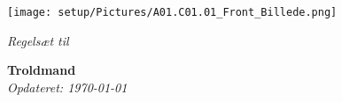 \documentclass[11pt,a4paper,openright]{report}
\begin{document}
\begin{titlepage}
    \begin{center}
        \texttt{[image: setup/Pictures/A01.C01.01\_Front\_Billede.png]}
        
        \vspace{0.5cm}
        \LARGE
        \textit{Regelsæt til}
        
        \vspace{4.5cm}
        \Huge
        \textbf{Troldmand}\\
        \vspace{4.5cm}
        \large
        \textit{Opdateret: \today}
\end{center}
\end{titlepage}

\pagestyle{plain} %
\renewcommand*\contentsname{Indholdsfortegnelse}
\tableofcontents








\end{document}
